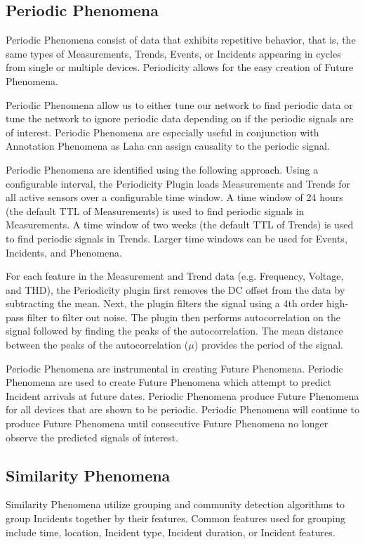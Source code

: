 \subsection{Periodic Phenomena} \label{subsec:periodicity-phenomena}
Periodic Phenomena consist of data that exhibits repetitive behavior, that is, the same types of Measurements, Trends, Events, or Incidents appearing in cycles from single or multiple devices. Periodicity allows for the easy creation of Future Phenomena.

Periodic Phenomena allow us to either tune our network to find periodic data or tune the network to ignore periodic data depending on if the periodic signals are of interest. Periodic Phenomena are especially useful in conjunction with Annotation Phenomena as Laha can assign causality to the periodic signal.

Periodic Phenomena are identified using the following approach. Using a configurable interval, the Periodicity Plugin loads Measurements and Trends for all active sensors over a configurable time window. A time window of 24 hours (the default TTL of Measurements) is used to find periodic signals in Measurements. A time window of two weeks (the default TTL of Trends) is used to find periodic signals in Trends. Larger time windows can be used for Events, Incidents, and Phenomena.

For each feature in the Measurement and Trend data (e.g. Frequency, Voltage, and THD), the Periodicity plugin first removes the DC offset from the data by subtracting the mean. Next, the plugin filters the signal using a 4th order high-pass filter to filter out noise. The plugin then performs autocorrelation on the signal followed by finding the peaks of the autocorrelation. The mean distance between the peaks of the autocorrelation ($\mu$) provides the period of the signal.

Periodic Phenomena are instrumental in creating Future Phenomena. Periodic Phenomena are used to create Future Phenomena which attempt to predict Incident arrivals at future dates. Periodic Phenomena produce Future Phenomena for all devices that are shown to be periodic. Periodic Phenomena will continue to produce Future Phenomena until consecutive Future Phenomena no longer observe the predicted signals of interest.

\subsection{Similarity Phenomena}\label{subsec:similarity-phenomena}
Similarity Phenomena utilize grouping and community detection algorithms to group Incidents together by their features. Common features used for grouping include time, location, Incident type, Incident duration, or Incident features.

